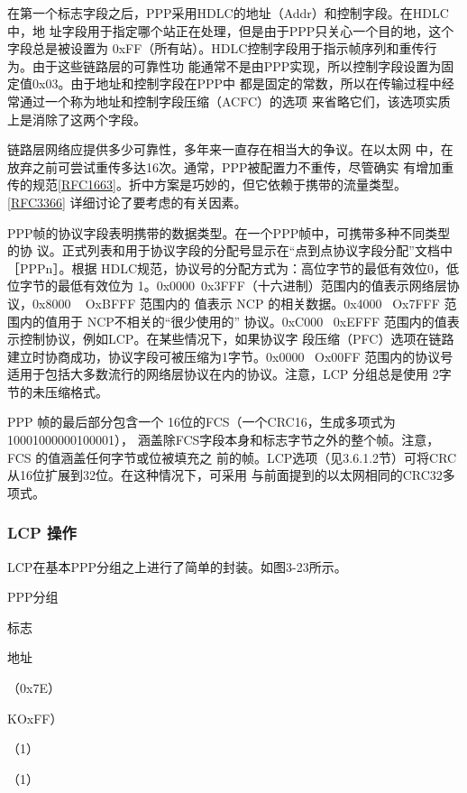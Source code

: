 在第一个标志字段之后，PPP采用HDLC的地址（Addr）和控制字段。在HDLC中，地
址字段用于指定哪个站正在处理，但是由于PPP只关心一个目的地，这个字段总是被设置为
0xFF（所有站）。HDLC控制字段用于指示帧序列和重传行为。由于这些链路层的可靠性功
能通常不是由PPP实现，所以控制字段设置为固定值0x03。由于地址和控制字段在PPP中
都是固定的常数，所以在传输过程中经常通过一个称为地址和控制字段压缩（ACFC）的选项
来省略它们，该选项实质上是消除了这两个字段。

\begin{tcolorbox}
    链路层网络应提供多少可靠性，多年来一直存在相当大的争议。在以太网
    中，在放弃之前可尝试重传多达16次。通常，PPP被配置力不重传，尽管确实
    有增加重传的规范\href{https://www.rfc-editor.org/rfc/rfc1663}{[RFC1663]}。折中方案是巧妙的，但它依赖于携带的流量类型。
    \href{https://www.rfc-editor.org/rfc/rfc3366}{[RFC3366]} 详细讨论了要考虑的有关因素。
\end{tcolorbox}

PPP帧的协议字段表明携带的数据类型。在一个PPP帧中，可携带多种不同类型的协
议。正式列表和用于协议字段的分配号显示在“点到点协议字段分配”文档中［PPPn］。根据
HDLC规范，协议号的分配方式为：高位字节的最低有效位0，低位字节的最低有效位为
1。0x0000~0x3FFF（十六进制）范围内的值表示网络层协议，0x8000 ~ OxBFFF 范围内的
值表示 NCP 的相关数据。0x4000~ Ox7FFF 范围内的值用于 NCP不相关的“很少使用的”
协议。0xC000~ 0xEFFF 范围内的值表示控制协议，例如LCP。在某些情况下，如果协议字
段压缩（PFC）选项在链路建立时协商成功，协议字段可被压缩为1字节。0x0000~ Ox00FF
范围内的协议号适用于包括大多数流行的网络层协议在内的协议。注意，LCP 分组总是使用
2字节的未压缩格式。

PPP 帧的最后部分包含一个 16位的FCS（一个CRC16，生成多项式为10001000000100001），
涵盖除FCS字段本身和标志字节之外的整个帧。注意，FCS 的值涵盖任何字节或位被填充之
前的帧。LCP选项（见3.6.1.2节）可将CRC从16位扩展到32位。在这种情况下，可采用
与前面提到的以太网相同的CRC32多项式。

\subsubsection{LCP 操作}

LCP在基本PPP分组之上进行了简单的封装。如图3-23所示。

PPP分组

标志

地址

（0x7E）

KOxFF）

（1）

（1）

